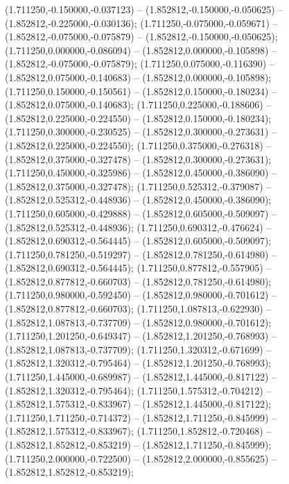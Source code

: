  (1.711250,-0.150000,-0.037123) -- (1.852812,-0.150000,-0.050625) -- (1.852812,-0.225000,-0.030136);
 (1.711250,-0.075000,-0.059671) -- (1.852812,-0.075000,-0.075879) -- (1.852812,-0.150000,-0.050625);
 (1.711250,0.000000,-0.086094) -- (1.852812,0.000000,-0.105898) -- (1.852812,-0.075000,-0.075879);
 (1.711250,0.075000,-0.116390) -- (1.852812,0.075000,-0.140683) -- (1.852812,0.000000,-0.105898);
 (1.711250,0.150000,-0.150561) -- (1.852812,0.150000,-0.180234) -- (1.852812,0.075000,-0.140683);
 (1.711250,0.225000,-0.188606) -- (1.852812,0.225000,-0.224550) -- (1.852812,0.150000,-0.180234);
 (1.711250,0.300000,-0.230525) -- (1.852812,0.300000,-0.273631) -- (1.852812,0.225000,-0.224550);
 (1.711250,0.375000,-0.276318) -- (1.852812,0.375000,-0.327478) -- (1.852812,0.300000,-0.273631);
 (1.711250,0.450000,-0.325986) -- (1.852812,0.450000,-0.386090) -- (1.852812,0.375000,-0.327478);
 (1.711250,0.525312,-0.379087) -- (1.852812,0.525312,-0.448936) -- (1.852812,0.450000,-0.386090);
 (1.711250,0.605000,-0.429888) -- (1.852812,0.605000,-0.509097) -- (1.852812,0.525312,-0.448936);
 (1.711250,0.690312,-0.476624) -- (1.852812,0.690312,-0.564445) -- (1.852812,0.605000,-0.509097);
 (1.711250,0.781250,-0.519297) -- (1.852812,0.781250,-0.614980) -- (1.852812,0.690312,-0.564445);
 (1.711250,0.877812,-0.557905) -- (1.852812,0.877812,-0.660703) -- (1.852812,0.781250,-0.614980);
 (1.711250,0.980000,-0.592450) -- (1.852812,0.980000,-0.701612) -- (1.852812,0.877812,-0.660703);
 (1.711250,1.087813,-0.622930) -- (1.852812,1.087813,-0.737709) -- (1.852812,0.980000,-0.701612);
 (1.711250,1.201250,-0.649347) -- (1.852812,1.201250,-0.768993) -- (1.852812,1.087813,-0.737709);
 (1.711250,1.320312,-0.671699) -- (1.852812,1.320312,-0.795464) -- (1.852812,1.201250,-0.768993);
 (1.711250,1.445000,-0.689987) -- (1.852812,1.445000,-0.817122) -- (1.852812,1.320312,-0.795464);
 (1.711250,1.575312,-0.704212) -- (1.852812,1.575312,-0.833967) -- (1.852812,1.445000,-0.817122);
 (1.711250,1.711250,-0.714372) -- (1.852812,1.711250,-0.845999) -- (1.852812,1.575312,-0.833967);
 (1.711250,1.852812,-0.720468) -- (1.852812,1.852812,-0.853219) -- (1.852812,1.711250,-0.845999);
 (1.711250,2.000000,-0.722500) -- (1.852812,2.000000,-0.855625) -- (1.852812,1.852812,-0.853219);
